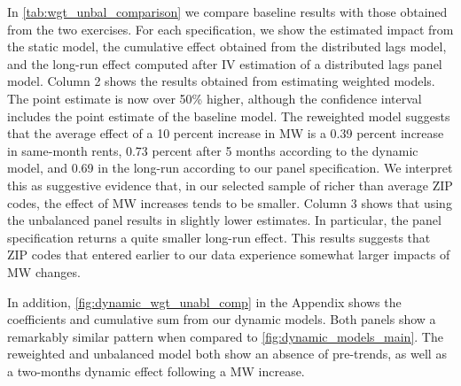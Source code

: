 In \autoref{tab:wgt_unbal_comparison} we compare baseline results with those obtained from the 
two exercises. For each specification, we show the estimated impact from the static model, the 
cumulative effect obtained from the distributed lags model, and the long-run effect computed 
after IV estimation of a distributed lags panel model. Column 2 shows the results obtained from 
estimating weighted models. The point estimate is now over 50\% higher, although the confidence 
interval includes the point estimate of the baseline model. The reweighted model suggests that 
the average effect of a 10 percent increase in MW is a 0.39 percent increase in same-month rents, 
0.73 percent after 5 months according to the dynamic model, and 0.69 in the long-run according 
to our panel specification. We interpret this as suggestive evidence that, in our selected sample 
of richer than average ZIP codes, the effect of MW increases tends to be smaller. Column 3 shows 
that using the unbalanced panel results in slightly lower estimates. In particular, the panel 
specification returns a quite smaller long-run effect. This results suggests that ZIP codes 
that entered earlier to our data experience somewhat larger impacts of MW changes.

In addition, \autoref{fig:dynamic_wgt_unabl_comp} in the Appendix shows the coefficients and 
cumulative sum from our dynamic models. Both panels show a remarkably similar pattern when 
compared to \autoref{fig:dynamic_models_main}. The reweighted and unbalanced model both show an 
absence of pre-trends, as well as a two-months dynamic effect following a MW increase.



